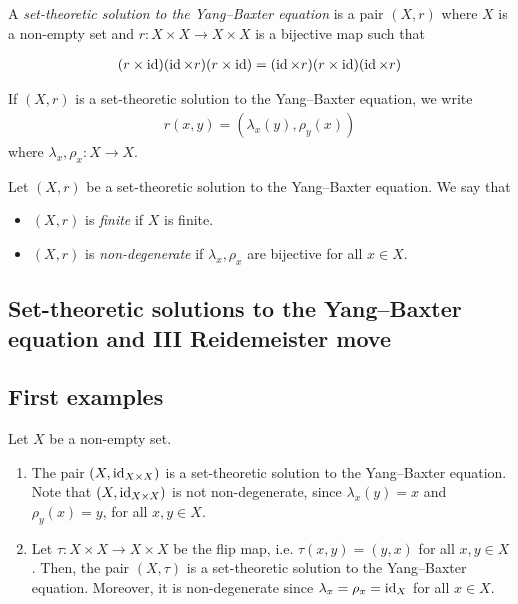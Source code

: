     \begin{definition}
        A \emph{set-theoretic solution to the Yang--Baxter equation} is a pair $(X,r)$ where $X$ is a non-empty set and $r: X\times X \to X \times X$ is a bijective map such that
        
        \begin{align*}
            (r\times \operatorname{id})(\operatorname{id} \times r)(r\times \operatorname{id}) = (\operatorname{id} \times r)(r\times \operatorname{id})(\operatorname{id} \times r)
        \end{align*}
    \end{definition}
    
    \begin{convention}
        If $(X,r)$ is a set-theoretic solution to the Yang--Baxter equation, we write 
        \begin{align*}
            r(x,y) = (\lambda_x(y),\rho_y(x))        
        \end{align*}
        where $\lambda_x,\rho_x:X\to X$.
    \end{convention}


    \begin{definition}
        Let $(X,r)$ be a set-theoretic solution to the  Yang--Baxter equation. We say that 
        \begin{itemize}
            \item $(X,r)$ is \emph{finite} if $X$ is finite.
            \item $(X,r)$ is \emph{non-degenerate} if $\lambda_x,\rho_x$ are bijective for all $x\in X$.
        \end{itemize}
    \end{definition}

\subsection{Set-theoretic solutions to the Yang--Baxter equation and III Reidemeister move}

\subsection{First examples}
    \begin{examples}
        Let $X$ be a non-empty set.  
        \begin{enumerate}
            \item The pair $(X,\operatorname{id}_{X\times X})$ is a  set-theoretic solution to the  Yang--Baxter equation. Note that $(X,\operatorname{id}_{X\times X})$ is not non-degenerate, since $\lambda_x(y)=x$ and $\rho_y(x)=y$, for all $x,y\in X$.
            \item Let $\tau: X \times X \to X \times X$ be the flip map, i.e. $\tau(x,y)=(y,x)$ for all $x,y \in X$. Then, the pair $(X,\tau)$ is a set-theoretic solution to the Yang--Baxter equation. Moreover, it is non-degenerate since $\lambda_x=\rho_x=\operatorname{id}_X$ for all $x\in X$.
        \end{enumerate}
    \end{examples}


